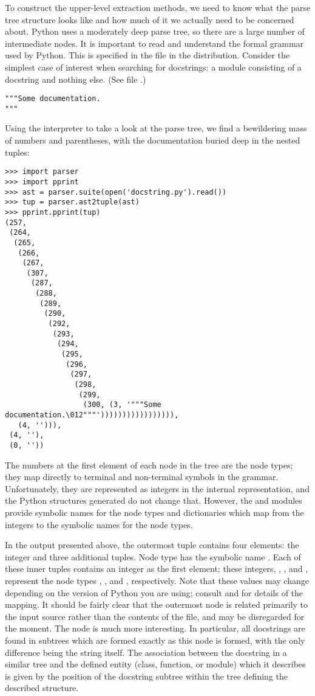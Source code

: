 To construct the upper-level extraction methods, we need to know what
the parse tree structure looks like and how much of it we actually
need to be concerned about.  Python uses a moderately deep parse tree,
so there are a large number of intermediate nodes.  It is important to
read and understand the formal grammar used by Python.  This is
specified in the file  in the distribution.
Consider the simplest case of interest when searching for docstrings:
a module consisting of a docstring and nothing else.  (See file
.)

\begin{verbatim}
"""Some documentation.
"""
\end{verbatim}

Using the interpreter to take a look at the parse tree, we find a
bewildering mass of numbers and parentheses, with the documentation
buried deep in the nested tuples:

\begin{verbatim}
>>> import parser
>>> import pprint
>>> ast = parser.suite(open('docstring.py').read())
>>> tup = parser.ast2tuple(ast)
>>> pprint.pprint(tup)
(257,
 (264,
  (265,
   (266,
    (267,
     (307,
      (287,
       (288,
        (289,
         (290,
          (292,
           (293,
            (294,
             (295,
              (296,
               (297,
                (298,
                 (299,
                  (300, (3, '"""Some documentation.\012"""'))))))))))))))))),
   (4, ''))),
 (4, ''),
 (0, ''))
\end{verbatim}

The numbers at the first element of each node in the tree are the node
types; they map directly to terminal and non-terminal symbols in the
grammar.  Unfortunately, they are represented as integers in the
internal representation, and the Python structures generated do not
change that.  However, the  and  modules
provide symbolic names for the node types and dictionaries which map
from the integers to the symbolic names for the node types.

In the output presented above, the outermost tuple contains four
elements: the integer  and three additional tuples.  Node
type  has the symbolic name .  Each of
these inner tuples contains an integer as the first element; these
integers, , , and , represent the node types
, , and , respectively.
Note that these values may change depending on the version of Python
you are using; consult  and  for
details of the mapping.  It should be fairly clear that the outermost
node is related primarily to the input source rather than the contents
of the file, and may be disregarded for the moment.  The 
node is much more interesting.  In particular, all docstrings are
found in subtrees which are formed exactly as this node is formed,
with the only difference being the string itself.  The association
between the docstring in a similar tree and the defined entity (class,
function, or module) which it describes is given by the position of
the docstring subtree within the tree defining the described
structure.

